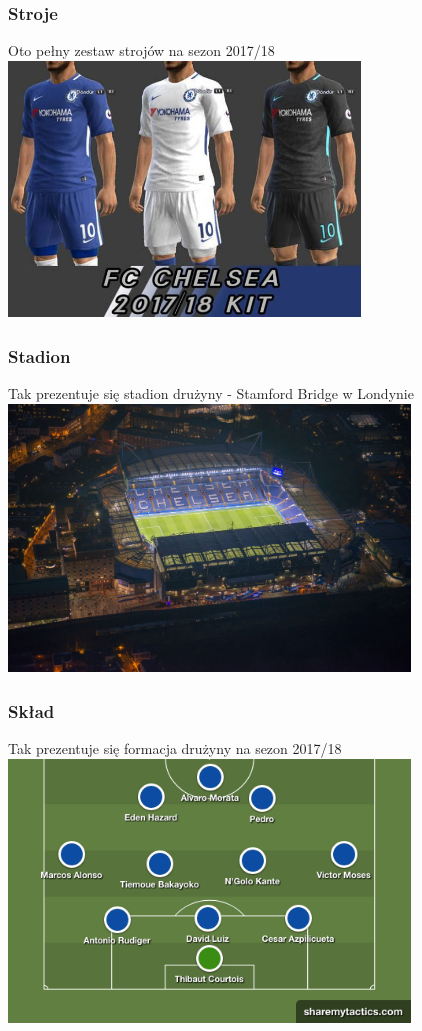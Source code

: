 \documentclass[]{beamer}
\begin{document}
\frame
{
	\frametitle{Stroje}
	\begin{block}
		{Oto pełny zestaw strojów na sezon 2017/18}
		\centering
		\includegraphics[width=0.7\textwidth]{kits.jpg}
	\end{block}
}
\frame
{
	\frametitle{Stadion}
	\begin{block}
		{Tak prezentuje się stadion drużyny - Stamford Bridge w Londynie}
		\centering
		\includegraphics[width=0.8\textwidth]{sb.jpg}
	\end{block}
}
\frame
{
	\frametitle{Skład}
	\begin{block}
		{Tak prezentuje się formacja drużyny na sezon 2017/18}
		\centering
		\includegraphics[width=0.8\textwidth]{squad.png}
	\end{block}
}
\end{document}
